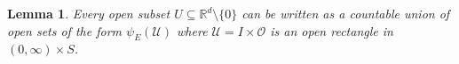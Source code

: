 \documentclass[11pt]{article}
\newtheorem{lemma}[theorem]{Lemma}
\theoremstyle{remark}
\begin{document}

\begin{lemma}\label{lem:OpenRectangle}
Every open subset $U\subseteq \mathbb{R}^d\setminus\{0\}$ can be written as a countable union of open sets of the form $\psi_E(\mathcal{U})$ where $\mathcal{U}=I\times\mathcal{O}$ is an open rectangle in $(0,\infty)\times S$.
\end{lemma}
\end{document}
